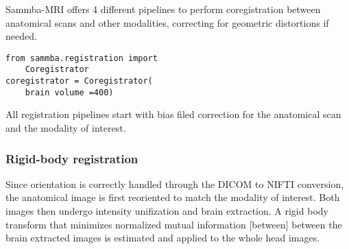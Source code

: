 \documentclass[utf8, a4paper, final, crop]{frontiersSCNS} %
\begin{document}

Sammba-MRI offers 4 different pipelines to perform coregistration
between anatomical scans and other modalities, correcting for geometric 
distortions if needed.
\begin{verbatim}
from sammba.registration import 
    Coregistrator
coregistrator = Coregistrator(
    brain volume =400)
\end{verbatim}
All registration pipelines start with bias filed correction for the anatomical scan
and the modality of interest. 

\subsubsection{Rigid-body registration}
Since orientation is correctly handled through the DICOM to NIFTI conversion,
the anatomical image is first reoriented to match the modality of interest.
Both images then undergo intensity unifization and brain extraction.
A rigid body
transform that minimizes normalized mutual information [between]
between the brain extracted images is estimated and applied to the whole head images.
\end{document}
